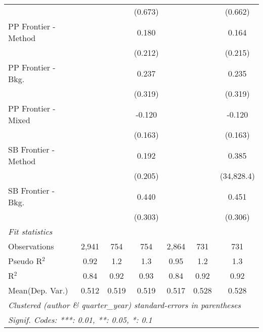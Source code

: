 \begin{tabular}{lcccccc}
                        &               &         & (0.673)      &               &         & (0.662)\\   
   PP Frontier - Method &               &         & 0.180        &               &         & 0.164\\   
                        &               &         & (0.212)      &               &         & (0.215)\\   
   PP Frontier - Bkg.   &               &         & 0.237        &               &         & 0.235\\   
                        &               &         & (0.319)      &               &         & (0.319)\\   
   PP Frontier - Mixed  &               &         & -0.120       &               &         & -0.120\\   
                        &               &         & (0.163)      &               &         & (0.163)\\   
   SB Frontier - Method &               &         & 0.192        &               &         & 0.385\\   
                        &               &         & (0.205)      &               &         & (34,828.4)\\   
   SB Frontier - Bkg.   &               &         & 0.440        &               &         & 0.451\\   
                        &               &         & (0.303)      &               &         & (0.306)\\   
   \midrule
   \emph{Fit statistics}\\
   Observations         & 2,941         & 754     & 754          & 2,864         & 731     & 731\\  
   Pseudo R$^2$         & 0.92          & 1.2     & 1.3          & 0.95          & 1.2     & 1.3\\  
   R$^2$                & 0.84          & 0.92    & 0.93         & 0.84          & 0.92    & 0.92\\  
Mean(Dep. Var.) & 0.512 & 0.519 & 0.519 & 0.517 & 0.528 & 0.528 \\
   \midrule \midrule
   \multicolumn{7}{l}{\emph{Clustered (author \& quarter\_year) standard-errors in parentheses}}\\
   \multicolumn{7}{l}{\emph{Signif. Codes: ***: 0.01, **: 0.05, *: 0.1}}\\
\end{tabular}
\par\endgroup
